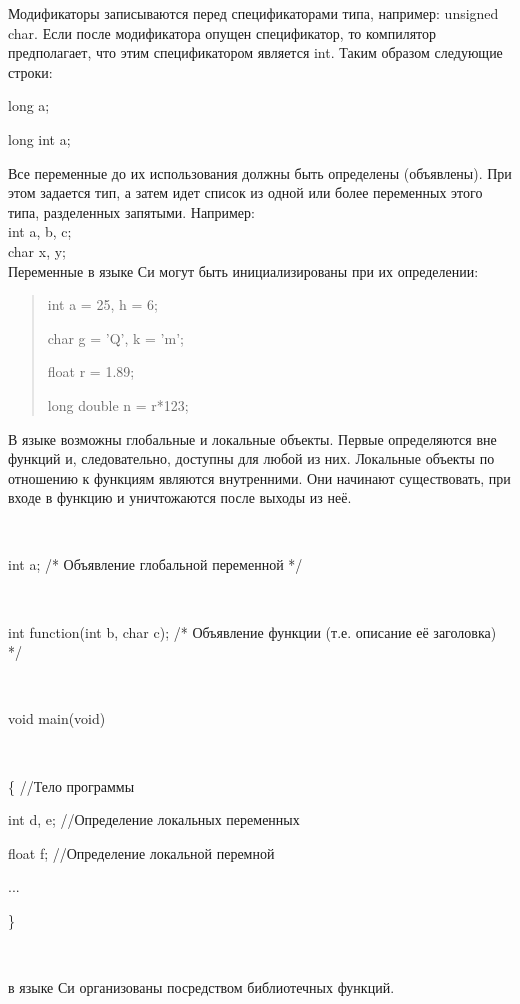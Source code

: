 \documentclass[a4paper, fontsize=10bp]{article} %
\begin{document}
\noindent Модификаторы записываются перед спецификаторами типа, например: unsigned char. Если после 
модификатора опущен спецификатор, то компилятор предполагает, что этим спецификатором является int.
Таким образом следующие строки:

\qquad \: long a;

\qquad \: long int a;

\noindent Все переменные до их использования должны быть определены (объявлены). При этом задается 
тип, а затем идет список из одной или более переменных этого типа, разделенных запятыми. Например:
\\
int a, b, c; 
\\
char x, y; \bigskip 
\\
Переменные в языке Си могут быть инициализированы при их определении:

\begin{quotation}
    int a = 25, h = 6;

    char g = 'Q', k = 'm';
    
    float r = 1.89;
    
    long double n = r*123;
\end{quotation}

\noindent В языке возможны глобальные и локальные объекты. Первые определяются вне функций и, следовательно,
доступны для любой из них. Локальные объекты по отношению к функциям являются внутренними. Они начинают 
существовать, при входе в функцию и уничтожаются после выходы из неё. 

\ 

int a; \qquad \qquad \:/* Объявление глобальной переменной */

\ 

int function(int b, char c); \: /* Объявление функции (т.е. описание её заголовка) */

\ 

void main(void)

\ 

\{ \qquad \qquad \qquad //Тело программы

\qquad int d, e; \quad  //Определение локальных переменных

\qquad float f;  \quad \: //Определение локальной перемной

\qquad ...

\}

\ 

 в языке Си организованы посредством библиотечных функций.
\end{document}
